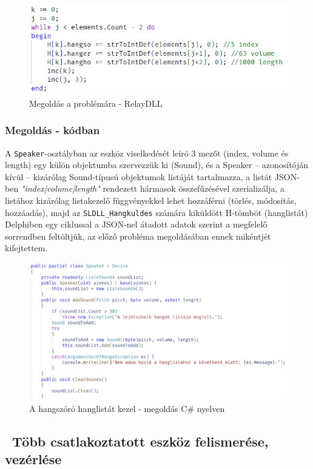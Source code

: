 \documentclass[tocnopagenum]{thesis-ekf}
\begin{document}
	\begin{figure}[h!]
		\centering
		\includegraphics{speaker_solved}
		\caption{Megoldás a problémára - RelayDLL}
		\label{speaker_solved}
	\end{figure}

	\subsubsection{Megoldás - kódban}
	A \verb*|Speaker|-osztályban az eszköz viselkedését leíró 3 mezőt (index, volume és length) egy külön objektumba szervezzük ki (Sound), és a Speaker -- azonosítóján kívül -- kizárólag Sound-típusú objektumok listáját tartalmazza, a listát JSON-ben \textit{"index|volume|length"} rendezett hármasok összefűzésével szerializálja, a listához kizárólag listakezelő függvényekkel lehet hozzáférni (törlés, módosítás, hozzáadás), majd az \verb*|SLDLL_Hangkuldes| számára kiküldött H-tömböt (hanglistát) Delphiben egy ciklussal a JSON-nel átadott adatok szerint a megfelelő sorrendben feltöltjük, az előző probléma megoldásában ennek mikéntjét kifejtettem.
	\begin{figure}[h!]
		\centering
		\includegraphics[scale=0.53]{speaker_csharp}
		\caption{A hangszóró hanglistát kezel - megoldás C\# nyelven}
		\label{speaker_csharp}
	\end{figure}

	\subsection{\ Több csatlakoztatott eszköz felismerése, vezérlése}
\end{document}
